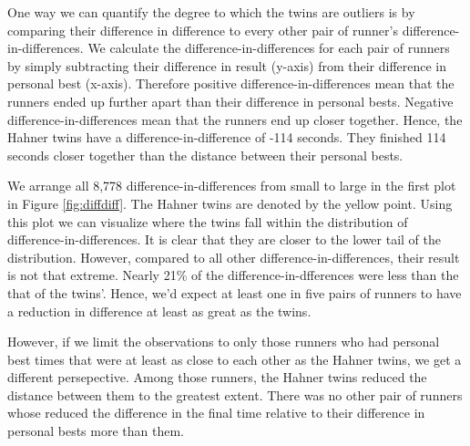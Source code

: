 \documentclass[12pt,titlepage]{article}
\begin{document}
One way we can quantify the degree to which the twins are outliers is by comparing their difference in difference to every other pair of runner's difference-in-differences.  We calculate the difference-in-differences for each pair of runners by simply subtracting their difference in result (y-axis) from their difference in personal best (x-axis).  Therefore positive difference-in-differences mean that the runners ended up further apart than their difference in personal bests.  Negative difference-in-differences mean that the runners end up closer together.  Hence, the Hahner twins have a difference-in-difference of -114 seconds.  They finished 114 seconds closer together than the distance between their personal bests.  

We arrange all 8,778 difference-in-differences from small to large in the first plot in Figure \ref{fig:diffdiff}. The Hahner twins are denoted by the yellow point.  Using this plot we can visualize where the twins fall within the distribution of difference-in-differences.  It is clear that they are closer to the lower tail of the distribution.  However, compared to all other difference-in-differences, their result is not that extreme.  Nearly 21\% of the difference-in-dfferences were less than the that of the twins'. Hence, we'd expect at least one in five pairs of runners to have a reduction in difference at least as great as the twins.

However, if we limit the observations to only those runners who had personal best times that were at least as close to each other as the Hahner twins, we get a different persepective.  Among those runners,  the Hahner twins reduced the distance between them to the greatest extent.  There was no other pair of runners whose reduced the difference in the final time relative to their difference in personal bests more than them.         
\end{document}
